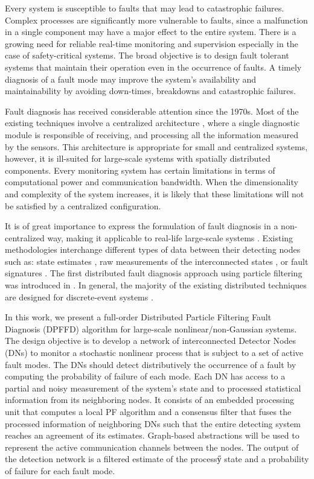 \documentclass[10pt,twocolumn,twoside]{IEEEtran}
\begin{document}
Every system is susceptible to faults that may lead to catastrophic failures. Complex processes are significantly more vulnerable to faults, since a malfunction in a single component may have a major effect to the entire system. There is a growing need for reliable real-time monitoring and supervision especially in the case of safety-critical systems. The broad objective is to design fault tolerant systems that maintain their operation even in the occurrence of faults. A timely diagnosis of a fault mode may improve the system's availability and maintainability by avoiding down-times, breakdowns and catastrophic failures.

Fault diagnosis has received considerable attention since the 1970s. Most of the existing techniques involve a centralized architecture \cite{Kabore2001,Zhang2001,Jiang2004,Xu2004,Chen2007,Tang2007}, where a single diagnostic module is responsible of receiving, and processing all the information measured by the sensors. This architecture is appropriate for small and centralized systems, however, it is ill-suited for large-scale systems with spatially distributed components. Every monitoring system has certain limitations in terms of computational power and communication bandwidth. When the dimensionality and complexity of the system increases, it is likely that these limitations will not be satisfied by a centralized configuration. 

It is of great importance to express the formulation of fault diagnosis in a non-centralized way, making it applicable to real-life large-scale systems \cite{Zhang2012,Ferrari2012,Boem2013a,Shames2011,Daigle2007,davoodi2014distributed}. Existing methodologies interchange different types of data between their detecting nodes such as: state estimates \cite{yan2008robust,Zhang2012,Daigle2007}, raw measurements of the interconnected states \cite{Ferrari2012,Boem2013a,Shames2011},
or fault signatures \cite{Daigle2007}. The first distributed fault diagnosis approach using particle filtering was introduced in \cite{cheng2005distributed,Cheng2009}. In general, the majority of the existing distributed techniques are designed for discrete-event systems \cite{Baroni1999,rish2005adaptive,le2006graphical}. 

In this work, we present a full-order Distributed Particle Filtering Fault Diagnosis (DPFFD) algorithm for large-scale nonlinear/non-Gaussian systems. The design objective is to develop a network of interconnected Detector Nodes (DNs) to monitor a stochastic nonlinear process that is subject to a set of active fault modes. The DNs should detect distributively the occurrence of a fault by computing the probability of failure of each mode. Each DN has access to a partial and noisy measurement of the system's state and to processed statistical information from its neighboring nodes. It consists of an embedded processing unit that computes a local PF algorithm and a consensus filter that fuses the processed information of neighboring DNs such that the entire detecting system reaches an agreement of its estimates. Graph-based abstractions will be used to represent the active communication channels between the nodes. The output of the detection network is a filtered estimate of the processӳ state and a probability of failure for each fault mode.  
\end{document}
